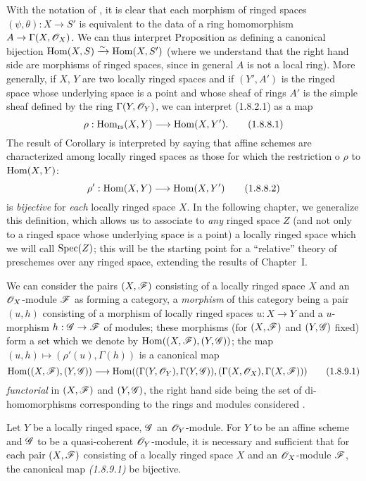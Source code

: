 \begin{env}[1.8.8]
\label{1.1.8.8}
With the notation of , it is clear  that each morphism
of ringed spaces $(\psi,\theta):X\to S'$ is equivalent to the data of a ring homomorphism
$A\to\Gamma(X,\mathscr{O}_X)$. We can thus interpret Proposition  as defining a canonical
bijection ${\mathop{\mathrm{Hom}}\nolimits}(X,S)\xrightarrow{\sim}{\mathop{\mathrm{Hom}}\nolimits}(X,S')$ (where we understand that the right hand side are
morphisms of ringed spaces, since in general $A$ is not a local ring). More generally, if
$X$, $Y$ are two locally ringed spaces and if $(Y',A')$ is the ringed space whose underlying
space is a point and whose sheaf of rings $A'$ is the simple sheaf defined by the
ring $\Gamma(Y,\mathscr{O}_Y)$, we can interpret (1.8.2.1) as a map
\[
  \rho:{\mathop{\mathrm{Hom}}\nolimits}_\text{rs}(X,Y)\longrightarrow{\mathop{\mathrm{Hom}}\nolimits}(X,Y').
  \tag{1.8.8.1}
\]
The result of Corollary  is interpreted by saying that affine schemes are
characterized among locally ringed spaces as those for which the restriction o $\rho$ to
${\mathop{\mathrm{Hom}}\nolimits}(X,Y)$:
\[
  \rho':{\mathop{\mathrm{Hom}}\nolimits}(X,Y)\longrightarrow{\mathop{\mathrm{Hom}}\nolimits}(X,Y')
  \tag{1.8.8.2}
\]
is \emph{bijective} for \emph{each} locally ringed space $X$. In the following chapter, we
generalize this definition, which allows us to associate to \emph{any} ringed space $Z$ (and
not only to a ringed space whose underlying space is a point) a locally ringed
space which we will call ${\mathop{\mathrm{Spec}}\nolimits}(Z)$; this will be the starting point for a ``relative''
theory of preschemes over any ringed space, extending the results of Chapter~I.
\end{env}

\begin{env}[1.8.9]
\label{1.1.8.9}
We can consider the pairs $(X,\mathscr{F})$ consisting of a locally ringed space $X$ and an
$\mathscr{O}_X$-module $\mathscr{F}$ as forming a category, a \emph{morphism} of this category being a
pair $(u,h)$ consisting of a morphism of locally ringed spaces
$u:X\to Y$ and a $u$-morphism $h:\mathscr{G}\to\mathscr{F}$ of modules; these morphisms (for
$(X,\mathscr{F})$ and $(Y,\mathscr{G})$ fixed) form a set which we denote by
${\mathop{\mathrm{Hom}}\nolimits}((X,\mathscr{F}),(Y,\mathscr{G}))$; the map $(u,h)\mapsto(\rho'(u),\Gamma(h))$ is a canonical
map
\[
  {\mathop{\mathrm{Hom}}\nolimits}((X,\mathscr{F}),(Y,\mathscr{G}))
  \longrightarrow{\mathop{\mathrm{Hom}}\nolimits}((\Gamma(Y,\mathscr{O}_Y),\Gamma(Y,\mathscr{G})),(\Gamma(X,\mathscr{O}_X),\Gamma(X,\mathscr{F})))
  \tag{1.8.9.1}
\]
\emph{functorial} in $(X,\mathscr{F})$ and $(Y,\mathscr{G})$, the right hand side being the set of
di-homomorphisms corresponding to the rings and modules considered .
\end{env}

\begin{cor}[1.8.10]
\label{1.1.8.10}
Let $Y$ be a locally ringed space, $\mathscr{G}$ an $\mathscr{O}_Y$-module. For $Y$ to be an affine scheme
and $\mathscr{G}$ to be a quasi-coherent $\mathscr{O}_Y$-module, it is necessary and sufficient that for
each pair $(X,\mathscr{F})$ consisting of a locally ringed space $X$ and an $\mathscr{O}_X$-module
$\mathscr{F}$, the canonical map \emph{(1.8.9.1)} be bijective.
\end{cor}

